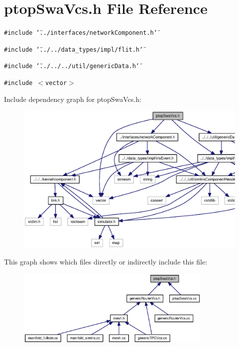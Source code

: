 \section{ptopSwaVcs.h File Reference}
\label{ptopSwaVcs_8h}
{\tt \#include \char`\"{}../interfaces/networkComponent.h\char`\"{}}\par
{\tt \#include \char`\"{}../../data\_\-types/impl/flit.h\char`\"{}}\par
{\tt \#include \char`\"{}../../../util/genericData.h\char`\"{}}\par
{\tt \#include $<$vector$>$}\par


Include dependency graph for ptopSwaVcs.h:\nopagebreak
\begin{figure}[H]
\begin{center}
\leavevmode
\includegraphics[width=361pt]{ptopSwaVcs_8h__incl}
\end{center}
\end{figure}


This graph shows which files directly or indirectly include this file:\nopagebreak
\begin{figure}[H]
\begin{center}
\leavevmode
\includegraphics[width=266pt]{ptopSwaVcs_8h__dep__incl}
\end{center}
\end{figure}
